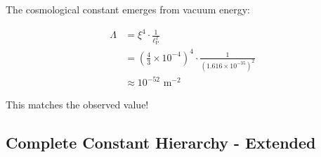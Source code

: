 \documentclass[12pt,a4paper]{article}
\newcommand{\lP}{\ell_{\text{P}}}
\newcommand{\xipar}{\xi}  %
\begin{document}
	The cosmological constant emerges from vacuum energy:
	
	\begin{keyresult}
		\begin{align}
			\Lambda &= \xipar^4 \cdot \frac{1}{\lP^2} \\
			&= \left(\frac{4}{3} \times 10^{-4}\right)^4 \cdot \frac{1}{(1.616 \times 10^{-35})^2} \\
			&\approx 10^{-52} \text{ m}^{-2}
		\end{align}
		
		This matches the observed value!
	\end{keyresult}
	
	\subsection{Complete Constant Hierarchy - Extended}
	
\end{document}
